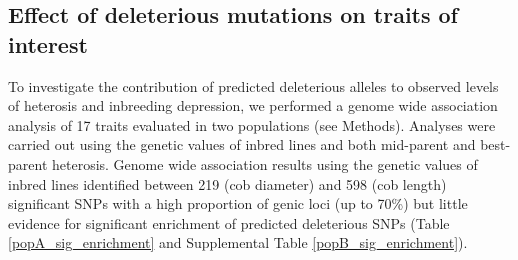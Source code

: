 \documentclass[12pt]{article}
\begin{document}
\subsection*{Effect of deleterious mutations on traits of interest}

To investigate the contribution of predicted deleterious alleles to observed levels of heterosis and inbreeding depression, we performed a genome wide association analysis of 17 traits evaluated in two populations (see Methods). Analyses were carried out using the genetic values of inbred lines and both mid-parent and best-parent heterosis. Genome wide association results using the genetic values of inbred lines identified between 219 (cob diameter) and 598 (cob length) significant SNPs with a high proportion of genic loci (up to 70\%) but little evidence for significant enrichment of predicted deleterious SNPs (Table \ref{popA_sig_enrichment} and Supplemental Table \ref{popB_sig_enrichment}). 
\end{document}
